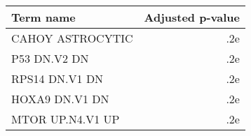 \begin{tabular}{lr}
\toprule
       Term name &  Adjusted p-value \\
\midrule
CAHOY ASTROCYTIC &               .2e \\
    P53 DN.V2 DN &               .2e \\
  RPS14 DN.V1 DN &               .2e \\
  HOXA9 DN.V1 DN &               .2e \\
MTOR UP.N4.V1 UP &               .2e \\
\bottomrule
\end{tabular}
